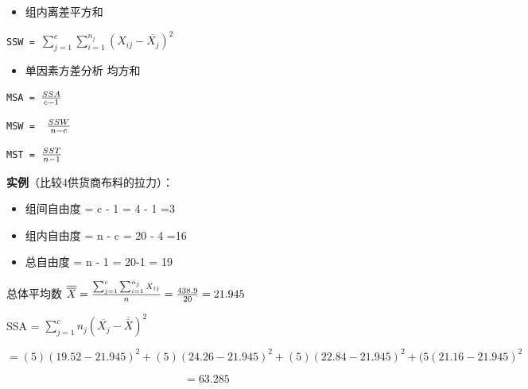 \begin{description}
\item[]
\end{description}

\begin{itemize}
\tightlist
\item
  组内离差平方和\\
\end{itemize}

\texttt{SSW~=~}\(\sum_{j=1}^c \sum_{i=1}^{n_j} (X_{ij} - \overline{X_j})^2\)

\begin{description}
\item[]
\end{description}

\begin{itemize}
\tightlist
\item
  单因素方差分析 均方和
\end{itemize}

\texttt{MSA~=~}\({SSA \over c -1}\)

\texttt{MSW~=~~}\({SSW \over n -c}\)

\texttt{MST~=~}\({SST \over n -1}\)

\textbf{实例}（比较4供货商布料的拉力）：

\begin{itemize}
\tightlist
\item
  组间自由度 = c - 1 = 4 - 1 =3
\item
  组内自由度 = n - c = 20 - 4 =16
\item
  总自由度 = n - 1 = 20-1 = 19
\end{itemize}

总体平均数
\(\overline{\overline{X}} = {\sum_{j=1}^c \sum_{i=1}^{n_j} X_{ij} \over n} = {438.9 \over 20}= 21.945\)

SSA = \(\sum_{j=1}^c n_j(\overline{X_j} - \overline{\overline{X}})^2\)

\[= (5)(19.52 - 21.945)^2 + (5)(24.26 - 21.945)^2 + (5)(22.84 - 21.945)^2 + (5(21.16 - 21.945)^2\]

\[= 63.285\]

